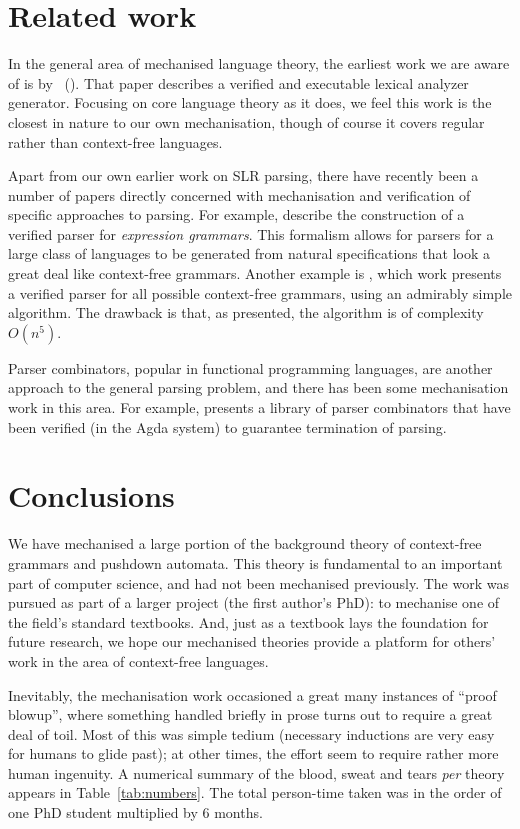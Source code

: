 \section{Related work}

In the general area of mechanised language theory, the earliest work we are aware of is by \citeauthor{nipkow98}~(\citeyear{nipkow98}).
That paper describes a verified and executable lexical analyzer generator.
%
Focusing on core language theory as it does, we feel this work is the closest in nature to our own mechanisation, though of course it covers regular rather than context-free languages.

Apart from our own earlier work on SLR parsing, there have recently been a number of papers directly concerned with mechanisation and verification of specific approaches to parsing.
For example, \cite{koprowski11:trx} describe the construction of a verified parser for \emph{expression grammars}.
This formalism allows for parsers for a large class of languages to be generated from natural specifications that look a great deal like context-free grammars.
Another example is \cite{ridge2011:cfg-parsing}, which work presents a verified parser for all possible context-free grammars, using an admirably simple algorithm.
The drawback is that, as presented, the algorithm is of complexity~$O(n^5)$.

Parser combinators, popular in functional programming languages, are another approach to the general parsing problem, and there has been some mechanisation work in this area.
For example, \citet{Danielsson2010:TPC} presents a library of parser combinators that have been verified (in the Agda system) to guarantee termination of parsing.


\section{Conclusions}

We have mechanised a large portion of the background theory of context-free grammars and pushdown automata.
%
This theory is fundamental to an important part of computer science, and had not been mechanised previously.
%
The work was pursued as part of a larger project (the first author's PhD): to mechanise one of the field's standard textbooks.
And, just as a textbook lays the foundation for future research, we hope our mechanised theories provide a platform for others' work in the area of context-free languages.
%

Inevitably, the mechanisation work occasioned a great many instances of ``proof blowup'', where something handled briefly in prose turns out to require a great deal of toil.
Most of this was simple tedium (necessary inductions are very easy for humans to glide past); at other times, the effort seem to require rather more human ingenuity.
A numerical summary of the blood, sweat and tears \emph{per} theory appears in Table~\ref{tab:numbers}.
The total person-time taken was in the order of one PhD student multiplied by 6 months.

